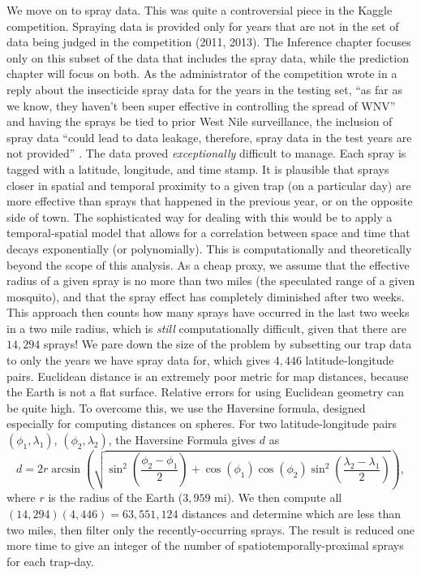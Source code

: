\documentclass[12pt]{article}
\begin{document}
We move on to spray data. This was quite a controversial piece in the Kaggle competition. Spraying data is provided only for years that are not in the set of data being judged in the competition (2011, 2013). The Inference chapter focuses only on this subset of the data that includes the spray data, while the prediction chapter will focus on both. As the administrator of the competition wrote in a reply about the insecticide spray data for the years in the testing set, ``as far as we know, they haven't been super effective in controlling the spread of WNV'' \cite{SprayQuote1} and having the sprays be tied to prior West Nile surveillance, the inclusion of spray data ``could lead to data leakage, therefore, spray data in the test years are not provided'' \cite{SprayQuote2}. The data proved \emph{exceptionally} difficult to manage. Each spray is tagged with a latitude, longitude, and time stamp. It is plausible that sprays closer in spatial and temporal proximity to a given trap (on a particular day) are more effective than sprays that happened in the previous year, or on the opposite side of town. The sophisticated way for dealing with this would be to apply a temporal-spatial model that allows for a correlation between space and time that decays exponentially (or polynomially). This is computationally and theoretically beyond the scope of this analysis. As a cheap proxy, we assume that the effective radius of a given spray is no more than two miles (the speculated range of a given mosquito), and that the spray effect has completely diminished after two weeks. This approach then counts how many sprays have occurred in the last two weeks in a two mile radius, which is \emph{still} computationally difficult, given that there are $14,294$ sprays! We pare down the size of the problem by subsetting our trap data to only the years we have spray data for, which gives $4,446$ latitude-longitude pairs. Euclidean distance is an extremely poor metric for map distances, because the Earth is not a flat surface. Relative errors for using Euclidean geometry can be quite high. To overcome this, we use the Haversine formula, designed especially for computing distances on spheres. For two latitude-longitude pairs $(\phi_1, \lambda_1)$, $(\phi_2, \lambda_2)$, the Haversine Formula gives $d$ as
\[ d = 2 r \arcsin\left(\sqrt{\sin^2\left(\frac{\phi_2 - \phi_1}{2}\right) + \cos(\phi_1) \cos(\phi_2)\sin^2\left(\frac{\lambda_2 - \lambda_1}{2}\right)}\right), \]
where $r$ is the radius of the Earth ($3,959$ mi). We then compute all $(14,294)(4,446) = 63,551,124$ distances and determine which are less than two miles, then filter only the recently-occurring sprays. The result is reduced one more time to give an integer of the number of spatiotemporally-proximal sprays for each trap-day.
\end{document}
